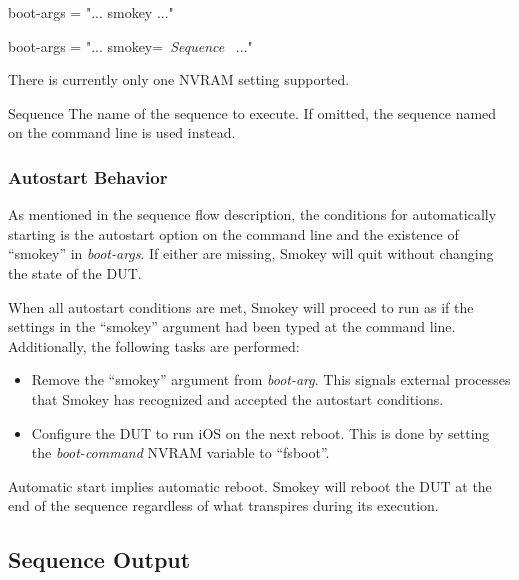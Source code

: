 \documentclass[11pt]{article}
\makeatletter
\newcommand{\iftt}[1]{\ifthenelse{\equal{\f@family}{\ttdefault}}{#1}{}}
\newcommand{\nvram}[1]{\mbox{\itshape#1}}
\newcommand{\nvarg}[1]{\mbox{``#1''}}
\newcommand{\param}[1]{{\iftt{\bfseries}{}\itshape#1}}
\makeatother
\begin{document}
\begin{Setting}
boot-args = "... smokey ..."
\end{Setting}

\begin{Setting}
boot-args = "... smokey=~\param{Sequence}~ ..."
\end{Setting}

There is currently only one NVRAM setting supported.

\begin{Definition}

\item[Sequence] The name of the sequence to execute.  If omitted, the sequence
	named on the command line is used instead.

\end{Definition}

\subsubsection{Autostart Behavior}

As mentioned in the sequence flow description, the conditions for automatically
starting is the autostart option on the command line and the existence of
\nvarg{smokey} in \nvram{boot-args}.  If either are missing, Smokey will quit without changing
the state of the DUT.

When all autostart conditions are met, Smokey will proceed to run as if the
settings in the \nvarg{smokey} argument had been typed at the command line.
Additionally, the following tasks are performed:

\begin{itemize}

\item Remove the \nvarg{smokey} argument from \nvram{boot-arg}.  This signals external
	processes that Smokey has recognized and accepted the autostart
	conditions.

\item Configure the DUT to run iOS on the next reboot.  This is done by
	setting the \nvram{boot-command} NVRAM variable to \nvarg{fsboot}.

\end{itemize}

Automatic start implies automatic reboot.  Smokey will reboot the DUT at the
end of the sequence regardless of what transpires during its execution.

\subsection{Sequence Output}
\end{document}
